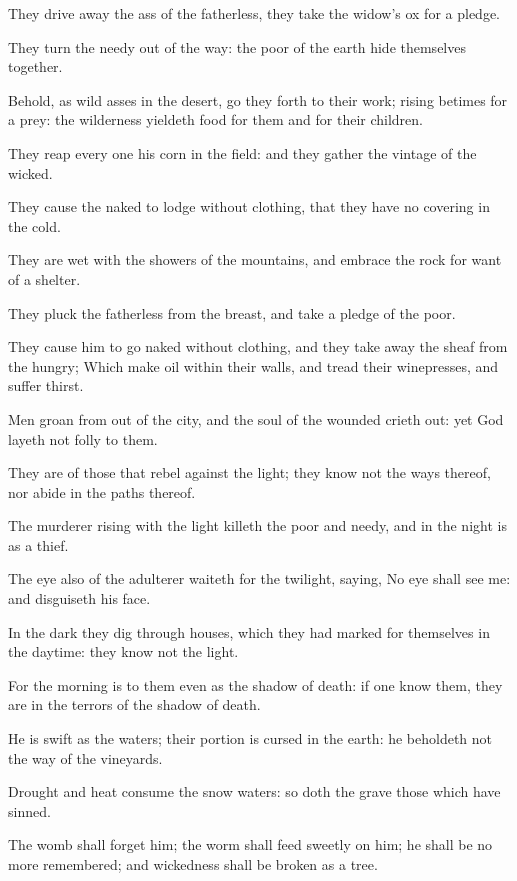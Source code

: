 \verse They drive away the ass of the fatherless, they take the widow's ox for a pledge.

\verse They turn the needy out of the way: the poor of the earth hide themselves together.

\verse Behold, as wild asses in the desert, go they forth to their work; rising betimes for a prey: the wilderness yieldeth food for them and for their children.

\verse They reap every one his corn in the field: and they gather the vintage of the wicked.

\verse They cause the naked to lodge without clothing, that they have no covering in the cold.

\verse They are wet with the showers of the mountains, and embrace the rock for want of a shelter.

\verse They pluck the fatherless from the breast, and take a pledge of the poor.

\verse They cause him to go naked without clothing, and they take away the sheaf from the hungry; \verse Which make oil within their walls, and tread their winepresses, and suffer thirst.

\verse Men groan from out of the city, and the soul of the wounded crieth out: yet God layeth not folly to them.

\verse They are of those that rebel against the light; they know not the ways thereof, nor abide in the paths thereof.

\verse The murderer rising with the light killeth the poor and needy, and in the night is as a thief.

\verse The eye also of the adulterer waiteth for the twilight, saying, No eye shall see me: and disguiseth his face.

\verse In the dark they dig through houses, which they had marked for themselves in the daytime: they know not the light.

\verse For the morning is to them even as the shadow of death: if one know them, they are in the terrors of the shadow of death.

\verse He is swift as the waters; their portion is cursed in the earth: he beholdeth not the way of the vineyards.

\verse Drought and heat consume the snow waters: so doth the grave those which have sinned.

\verse The womb shall forget him; the worm shall feed sweetly on him; he shall be no more remembered; and wickedness shall be broken as a tree.

